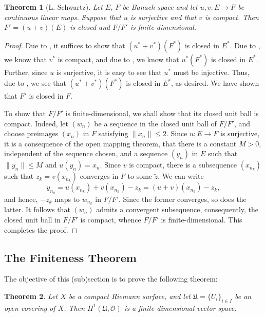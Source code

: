 \documentclass[10pt]{article}
\theoremstyle{thmstyle}
\newtheorem{theorem}{Theorem}[section]
\theoremstyle{defstyle}
\newcommand{\frakU}{\mathfrak{U}}
\newcommand{\scrO}{\mathscr{O}} %
\newcommand{\wt}[1]{\widetilde{#1}}
\renewcommand{\le}{\leqslant}
\begin{document}
\begin{theorem}[L. Schwartz]
    Let $E$, $F$ be Banach space and let $u, v: E\to F$ be continuous linear maps. Suppose that $u$ is surjective and that $v$ is compact. Then $F' = (u + v)(E)$ is closed and $F/F'$ is finite-dimensional.
\end{theorem}
\begin{proof}
    Due to , it suffices to show that $(u^\ast + v^\ast)(F^\ast)$ is closed in $E^\ast$. Due to , we know that $v^\ast$ is compact, and due to , we know that $u^\ast(F^\ast)$ is closed in $E^\ast$. Further, since $u$ is surjective, it is easy to see that $u^\ast$ must be injective. Thus, due to , we see that $(u^\ast + v^\ast)(F^\ast)$ is closed in $E^\ast$, as desired. We have shown that $F'$ is closed in $F$.

    To show that $F/F'$ is finite-dimensional, we shall show that its closed unit ball is compact. Indeed, let $(w_n)$ be a sequence in the closed unit ball of $F/F'$, and choose preimages $(x_n)$ in $F$ satisfying $\|x_n\|\le 2$. Since $u: E\to F$ is surjective, it is a consequence of the open mapping theorem, that there is a constant $M > 0$, independent of the sequence chosen, and a sequence $(y_n)$ in $E$ such that $\|y_n\|\le M$ and $u(y_n) = x_n$. Since $v$ is compact, there is a subsequence $(x_{n_k})$ such that $z_k = v(x_{n_k})$ converges in $F$ to some $\wt z$. We can write 
    \begin{equation*}
        y_{n_k} = u(x_{n_k}) + v(x_{n_k}) - z_k = (u + v)(x_{n_k}) - z_k,
    \end{equation*}
    and hence, $-z_k$ maps to $w_{n_k}$ in $F/F'$. Since the former converges, so does the latter. It follows that $(w_n)$ admits a convergent subsequence, consequently, the closed unit ball in $F/F'$ is compact, whence $F/F'$ is finite-dimensional. This completes the proof.
\end{proof}

\subsection{The Finiteness Theorem}

The objective of this (sub)section is to prove the following theorem: 
\begin{theorem}
    Let $X$ be a compact Riemann surface, and let $\frakU = \{U_i\}_{i\in I}$ be an open covering of $X$. Then $H^1(\frakU,\scrO)$ is a finite-dimensional vector space.
\end{theorem}
\end{document}
